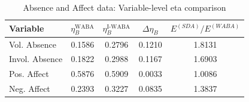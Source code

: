 \begin{table}[ht]
\centering
\caption{Absence and Affect data: Variable-level eta comparison}
\label{tab:absence_eta}
\begin{tabular}{lcccc}
\toprule
Variable & $\eta_B^{\text{WABA}}$ & $\eta_B^{\text{I-WABA}}$ & $\Delta\eta_B$ & $E^{(SDA)}/E^{(WABA)}$ \\
\midrule
Vol. Absence & 0.1586 & 0.2796 & 0.1210 & 1.8131 \\
Invol. Absence & 0.1822 & 0.2988 & 0.1167 & 1.6903 \\
Pos. Affect & 0.5876 & 0.5909 & 0.0033 & 1.0086 \\
Neg. Affect & 0.2393 & 0.3227 & 0.0835 & 1.3837 \\
\bottomrule
\end{tabular}
\end{table}
